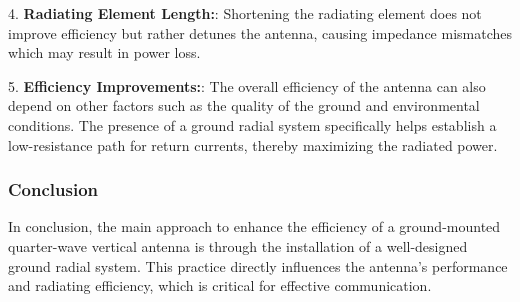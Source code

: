4. \textbf{Radiating Element Length:}: Shortening the radiating element does not improve efficiency but rather detunes the antenna, causing impedance mismatches which may result in power loss.

5. \textbf{Efficiency Improvements:}: The overall efficiency of the antenna can also depend on other factors such as the quality of the ground and environmental conditions. The presence of a ground radial system specifically helps establish a low-resistance path for return currents, thereby maximizing the radiated power.

\subsubsection{Conclusion}

In conclusion, the main approach to enhance the efficiency of a ground-mounted quarter-wave vertical antenna is through the installation of a well-designed ground radial system. This practice directly influences the antenna's performance and radiating efficiency, which is critical for effective communication.

\begin{center}
\end{center}
